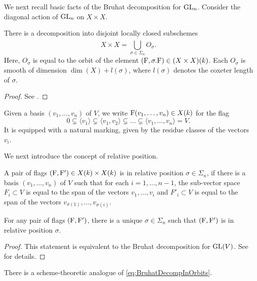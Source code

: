 \documentclass[../main.tex]{subfiles}
\begin{document}
We next recall basic facts of the Bruhat decomposition for $\operatorname{GL}_n$. 
Consider the diagonal action of $\operatorname{GL}_n$ on $X \times X$.
\begin{prop}\label{prop:BruhatDecomp}
  There is a decomposition into disjoint locally closed subschemes
  \begin{equation*}
    X \times X = \bigcup_{\sigma \in \Sigma_n}^{\cdot} O_\sigma.
  \end{equation*}
  Here, $O_\sigma$ is equal to the orbit of the element 
  $(\mathrm{F}, \sigma.\mathrm{F}) \in (X \times X)(k)$. Each $O_\sigma$ is smooth of dimension
  $\dim(X) + l(\sigma)$, where $l(\sigma)$ denotes the coxeter length of $\sigma$.
\begin{proof}
  See .
\end{proof}
\end{prop}

Given a basis $(v_1, \dots, v_n)$ of $V$, we write $\mathrm{F}(v_1, \dots, v_n) \in X(k)$ for
the flag
\begin{equation*}
  0 \subsetneq \langle v_1 \rangle \subsetneq \langle v_1, v_2 \rangle 
  \subsetneq \dots \subsetneq \langle v_1, \dots, v_n \rangle = V. 
\end{equation*}
It is equipped with a natural marking, given by the residue classes of the
vectors $v_i$. 


We next introduce the concept of relative position. 

\begin{defi}\label{def:RelPos}
  A pair of flags $(\mathrm{F},\mathrm{F}') \in X(k) \times X(k)$ is in relative position
  $\sigma \in \Sigma_n$,
  if there is a basis $(v_1, \dots, v_n)$ of $V$ such that for each $i = 
  1, \dots, n-1$, the sub-vector space $F_i \subset V$ is equal to the span of
  the vectors $v_1, \dots, v_i$ and $F'_i \subset V$ is equal to the span 
  of the vectors $v_{\sigma(1)}, \dots, v_{\sigma(i)}$.
\end{defi}
\begin{prop}\label{prop:RelativePosWellDef}
  For any pair of flags $(\mathrm{F}, \mathrm{F}')$, there is a unique $\sigma \in 
  \Sigma_n$ such that $(\mathrm{F}, \mathrm{F}')$ is in relative position $\sigma$. 
\begin{proof}
  This statement is equivalent to the Bruhat decomposition for $\operatorname{GL}(V)$. See 
  \cite[Chapter 21]{milne2017algebraic} for details.
\end{proof}
\end{prop}
There is a scheme-theoretic analogue of \eqref{eq:BruhatDecompInOrbits}. 
\end{document}
